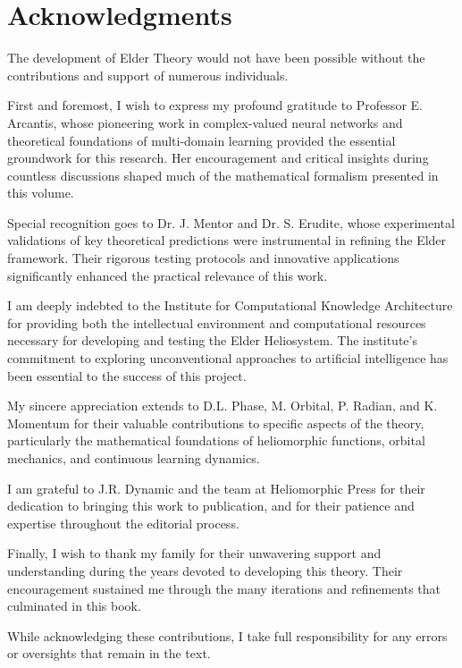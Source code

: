 \documentclass[11pt,twoside]{book}
\begin{document}
\chapter*{Acknowledgments}

The development of Elder Theory would not have been possible without the contributions and support of numerous individuals.

First and foremost, I wish to express my profound gratitude to Professor E. Arcantis, whose pioneering work in complex-valued neural networks and theoretical foundations of multi-domain learning provided the essential groundwork for this research. Her encouragement and critical insights during countless discussions shaped much of the mathematical formalism presented in this volume.

Special recognition goes to Dr. J. Mentor and Dr. S. Erudite, whose experimental validations of key theoretical predictions were instrumental in refining the Elder framework. Their rigorous testing protocols and innovative applications significantly enhanced the practical relevance of this work.

I am deeply indebted to the Institute for Computational Knowledge Architecture for providing both the intellectual environment and computational resources necessary for developing and testing the Elder Heliosystem. The institute's commitment to exploring unconventional approaches to artificial intelligence has been essential to the success of this project.

My sincere appreciation extends to D.L. Phase, M. Orbital, P. Radian, and K. Momentum for their valuable contributions to specific aspects of the theory, particularly the mathematical foundations of heliomorphic functions, orbital mechanics, and continuous learning dynamics.

I am grateful to J.R. Dynamic and the team at Heliomorphic Press for their dedication to bringing this work to publication, and for their patience and expertise throughout the editorial process.

Finally, I wish to thank my family for their unwavering support and understanding during the years devoted to developing this theory. Their encouragement sustained me through the many iterations and refinements that culminated in this book.

While acknowledging these contributions, I take full responsibility for any errors or oversights that remain in the text.
\end{document}
